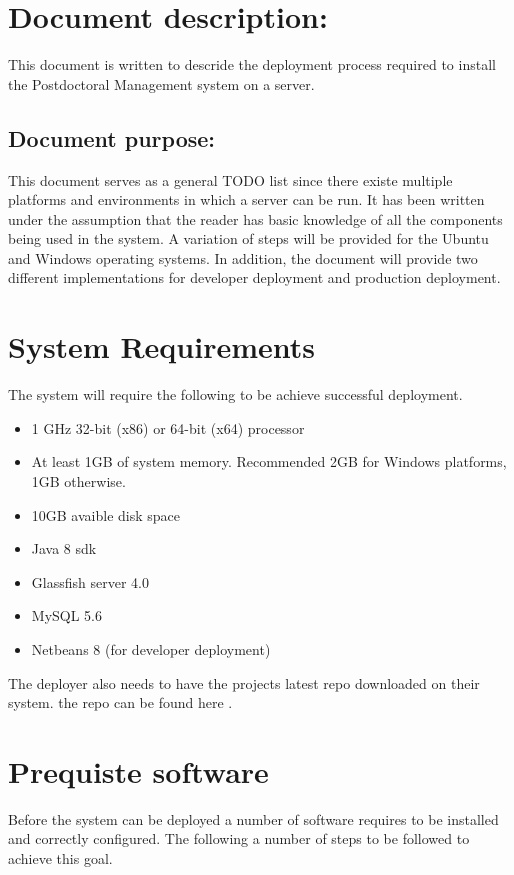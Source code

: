 \documentclass[12pt]{article}
\begin{document}
\listoffigures
\newpage
\section{Document description:}
This document is written to descride the deployment process required to install the Postdoctoral Management system on a server.
\subsection{Document purpose:}
\vspace{0.2in}
This document serves as a general TODO list since there existe multiple platforms and environments in which a server can be run. It has been written under the assumption that the reader has basic knowledge of all the components being used in the system. A variation of steps will be provided for the Ubuntu and Windows operating systems. In addition, the document will provide two different implementations for developer deployment and production deployment. 

\vspace{0.2in}

\section{System Requirements}
The system will require the following to be achieve successful deployment.
\begin{itemize}
\item 1 GHz 32-bit (x86) or 64-bit (x64) processor
\item At least 1GB of system memory. Recommended 2GB for Windows platforms, 1GB otherwise.
\item 10GB avaible disk space
\item Java 8 sdk
\item Glassfish server 4.0
\item MySQL 5.6
\item Netbeans 8 (for developer deployment)
\end{itemize}
The deployer also needs to have the projects latest repo downloaded on their system. the repo can be found here \textbf{}.

\section{Prequiste software}
Before the system can be deployed a number of software requires to be installed and correctly configured. The following a number of steps to be followed to achieve this goal.
\end{document}
